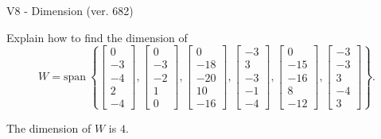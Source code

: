 \begin{exercise}
  \begin{exerciseTitle}V8 - Dimension (ver. 682)\end{exerciseTitle}
  \begin{exerciseStatement}
    Explain how to find the dimension of 
\[W=\mathrm{span}\ \left\{\left[\begin{array}{r}
0 \\
-3 \\
-4 \\
2 \\
-4
\end{array}\right] , \left[\begin{array}{r}
0 \\
-3 \\
-2 \\
1 \\
0
\end{array}\right] , \left[\begin{array}{r}
0 \\
-18 \\
-20 \\
10 \\
-16
\end{array}\right] , \left[\begin{array}{r}
-3 \\
3 \\
-3 \\
-1 \\
-4
\end{array}\right] , \left[\begin{array}{r}
0 \\
-15 \\
-16 \\
8 \\
-12
\end{array}\right] , \left[\begin{array}{r}
-3 \\
-3 \\
3 \\
-4 \\
3
\end{array}\right]\right\}.\]



  \end{exerciseStatement}
  \begin{exerciseAnswer}
   The dimension of \(W\) is  \(4\).
  


  \end{exerciseAnswer}
\end{exercise}